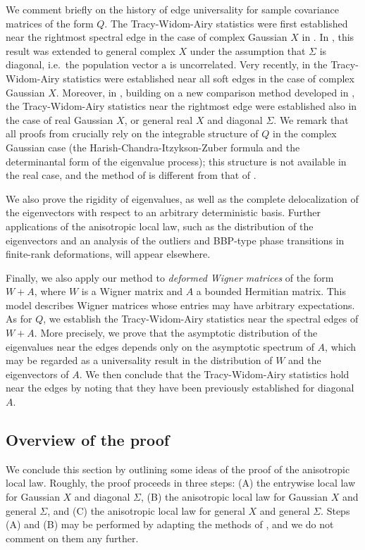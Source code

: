 \documentclass[11pt]{article} %
\numberwithin{equation}{section}
\numberwithin{figure}{section}
\theoremstyle{plain} %
\theoremstyle{definition} %
\newcommand{\f}[1]{\boldsymbol{\mathrm{#1}}} %
\begin{document}
We comment briefly on the history of edge universality for sample covariance matrices of the form $Q$. The Tracy-Widom-Airy statistics were first established near the rightmost spectral edge in the case of complex Gaussian $X$ in \cite{ElK2, Ona}. In \cite{BaoPanZhou}, this result was extended to general complex $X$ under the assumption that $\Sigma$ is diagonal, i.e.\ the population vector $\f a$ is uncorrelated. Very recently, in \cite{HHN} the Tracy-Widom-Airy statistics were established near all soft edges in the case of complex Gaussian $X$. Moreover, in \cite{SL}, building on a new comparison method developed in \cite{LSY}, the Tracy-Widom-Airy statistics near the rightmost edge were established also in the case of real Gaussian $X$, or general real $X$ and diagonal $\Sigma$. We remark that all proofs from \cite{ElK2, Ona, HHN} crucially rely on the integrable structure of $Q$ in the complex Gaussian case (the Harish-Chandra-Itzykson-Zuber formula and the determinantal form of the eigenvalue process); this structure is not available in the real case, and the method of \cite{SL} is different from that of \cite{HHN, ElK2, Ona}.


We also prove the rigidity of eigenvalues, as well as the complete delocalization of the eigenvectors with respect to an arbitrary deterministic basis. Further applications of the anisotropic local law, such as the distribution of the eigenvectors and an analysis of the outliers and BBP-type phase transitions in finite-rank deformations, will appear elsewhere.

Finally, we also apply our method to \emph{deformed Wigner matrices} of the form $W + A$, where $W$ is a Wigner matrix and $A$ a bounded Hermitian matrix. This model describes Wigner matrices whose entries may have arbitrary expectations. As for $Q$, we establish the Tracy-Widom-Airy statistics near the spectral edges of $W+A$. More precisely, we prove that the asymptotic distribution of the eigenvalues near the edges depends only on the asymptotic spectrum of $A$, which may be regarded as a universality result in the distribution of $W$ and the eigenvectors of $A$. We then conclude that the Tracy-Widom-Airy statistics hold near the edges by noting that they have been previously established \cite{LSY} for diagonal $A$.

\subsection{Overview of the proof}
We conclude this section by outlining some ideas of the proof of the anisotropic local law. Roughly, the proof proceeds in three steps: (A) the entrywise local law for Gaussian $X$ and diagonal $\Sigma$, (B) the anisotropic local law for Gaussian $X$ and general $\Sigma$, and (C) the anisotropic local law for general $X$ and general $\Sigma$. Steps (A) and (B) may be performed by adapting the methods of \cite{BEKYY}, and we do not comment on them any further.
\end{document}
